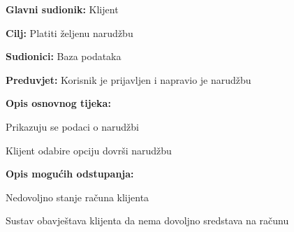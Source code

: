 				\noindent {}
				\begin{packed_item}
					
					\item \textbf{Glavni sudionik: } Klijent
					\item  \textbf{Cilj:} Platiti željenu narudžbu
					\item  \textbf{Sudionici:} Baza podataka
					\item  \textbf{Preduvjet:} Korisnik je prijavljen i napravio je narudžbu
					\item  \textbf{Opis osnovnog tijeka:}
					
					\item[] \begin{packed_enum}
						
						\item Prikazuju se podaci o narudžbi
						\item Klijent odabire opciju dovrši narudžbu
					\end{packed_enum}
					
					\item  \textbf{Opis mogućih odstupanja:}
					
					\item[] \begin{packed_item}
						
						\item[-] Nedovoljno stanje računa klijenta
						\item[] \begin{packed_enum}
							
							\item Sustav obavještava klijenta da nema dovoljno sredstava na računu
							
						\end{packed_enum}
						
					\end{packed_item}
				\end{packed_item}
				

